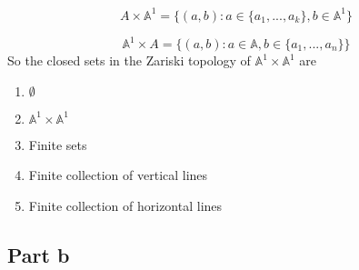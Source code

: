 \documentclass[12pt]{article}
\begin{document}
$$A \times \mathbb{A}^1  = \{(a,b): a \in \{a_1,...,a_k\}, b \in \mathbb{A}^1 \}$$ 

$$ \mathbb{A}^1 \times A  = \{(a,b): a \in \mathbb{A}, b \in \{a_1,...,a_n\} \}$$
So the closed sets in the Zariski topology of $\mathbb{A}^1 \times \mathbb{A}^1$ are
\begin{enumerate}
\item $\emptyset$
\item $\mathbb{A}^1 \times \mathbb{A}^1$
\item Finite sets
\item Finite collection of vertical lines
\item Finite collection of horizontal lines
\end{enumerate}
\subsection*{Part b}
\end{document}
